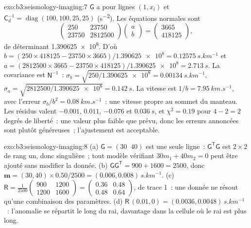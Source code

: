 \begin{solution}{exo:b3:seismology-imaging:7}
$\mathsf G$ a pour lignes $(1, x_i)$ et $\mathsf C_d^{-1} = \operatorname{diag}
(100, 100, 25, 25)$ (\unit{s^{-2}}). Les équations normales sont
\[
  \begin{pmatrix} 250 & 23750 \\ 23750 & \num{2812500} \end{pmatrix}
  \begin{pmatrix} a \\ b \end{pmatrix}
  = \begin{pmatrix} 3665 \\ 418125 \end{pmatrix},
\]
de déterminant \num{1.390625e8}. D'où $b = (250\times418125 -
23750\times3665)/\num{1.390625e8} = \qty{0.12575}{s.km^{-1}}$ et
$a = (2812500\times3665 - 23750\times418125)/\num{1.390625e8} =
\qty{2.713}{s}$. La covariance est $\mathsf N^{-1}$~: $\sigma_b =
\sqrt{250/\num{1.390625e8}} = \qty{0.00134}{s.km^{-1}}$, $\sigma_a =
\sqrt{2812500/\num{1.390625e8}} = \qty{0.142}{s}$. La vitesse est
$1/b = \qty{7.95}{km.s^{-1}}$, avec l'erreur $\sigma_b/b^2 =
\qty{0.08}{km.s^{-1}}$~: une vitesse propre au sommet du manteau. Les résidus valent $-0.001$,
$0.011$, $-0.076$ et $\qty{0.036}{s}$, et $\chi^2 = 0.19$ pour $4 - 2 = 2$
degrés de liberté~: une valeur plus faible que prévu, donc les erreurs annoncées sont
plutôt généreuses~; l'ajustement est acceptable.
\end{solution}

\begin{solution}{exo:b3:seismology-imaging:8}
(a) $\mathsf G = (30\;\;40)$ est une seule ligne~: $\mathsf G^{\mathsf T}\mathsf G$ est
$2\times2$ de rang un, donc singulière~; tout modèle vérifiant $30m_1 + 40m_2 = 0$ peut
être ajouté sans modifier la donnée. (b) $\mathsf G\mathsf G^{\mathsf T} =
900 + 1600 = 2500$, donc $\mathbf m = (30, 40)\times0.50/2500 =
(0.006, 0.008)\,\unit{s.km^{-1}}$. (c) $\mathsf R = \frac{1}{2500}
\begin{pmatrix} 900 & 1200 \\ 1200 & 1600 \end{pmatrix} =
\begin{pmatrix} 0.36 & 0.48 \\ 0.48 & 0.64 \end{pmatrix}$, de trace 1~: une
donnée ne résout qu'une combinaison des paramètres. (d) $\mathsf R\,(0.01, 0) =
(0.0036, 0.0048)\,\unit{s.km^{-1}}$~: l'anomalie se répartit le long du rai, davantage
dans la cellule où le rai est plus long.
\end{solution}

